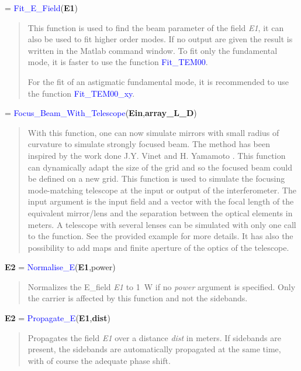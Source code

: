  = \textcolor{blue}{Fit\_E\_Field}(\textbf{E1})
\vspace*{-0.2cm}
\begin{quote}
This function is used to find the beam parameter of the field \textsl{E1}, it can also be used to fit higher order modes. If no output are given the result is written in the Matlab command window. To fit only the fundamental mode, it is faster to use the function \textcolor{blue}{Fit\_TEM00}.

For the fit of an astigmatic fundamental mode, it is recommended to use the function \textcolor{blue}{Fit\_TEM00\_xy}.
\end{quote}


 = \textcolor{blue}{Focus\_Beam\_With\_Telescope}(\textbf{Ein},\textbf{array\_L\_D})
\vspace*{-0.2cm}
\begin{quote}
With this function, one can now simulate mirrors with small radius of curvature to simulate strongly focused beam. The method has been inspired by the work done J.Y. Vinet \cite{Virgo_PB} and H. Yamamoto \cite{Hiro1}.
This function can dynamically adapt the size of the grid and so the focused beam could be defined on a new grid. This function is used to simulate the focusing mode-matching telescope at the input or output of the interferometer.
The input argument is the input field and a vector with the focal length of the equivalent mirror/lens and the separation between the optical elements in meters. A telescope with several lenses can be simulated with only one call to the function.
See the provided example for more details.
It has also the possibility to add maps and finite aperture of the optics of the telescope.
\end{quote}

\noindent \textbf{E2} = \textcolor{blue}{Normalise\_E}(\textbf{E1},power)
\vspace*{-0.2cm}
\begin{quote}
Normalizes the E\_field \textsl{E1} to 1~W if no \textsl{power} argument is specified. Only the carrier is affected by this function and not the sidebands.
\end{quote}

\noindent \textbf{E2} = \textcolor{blue}{Propagate\_E}(\textbf{E1},\textbf{dist})
\vspace*{-0.2cm}
\begin{quote}
Propagates the field \textsl{E1} over a distance \textsl{dist} in meters. If sidebands are present, the sidebands are automatically propagated at the same time, with of course the adequate phase shift.
\end{quote}

